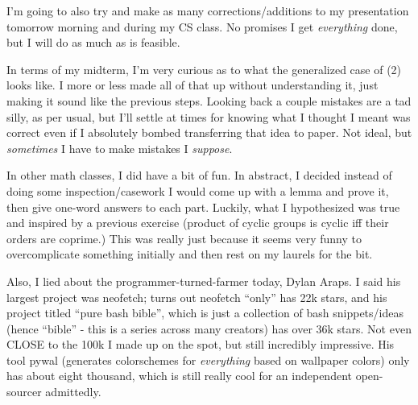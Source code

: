 \documentclass[12pt]{article}
\begin{document}
I'm going to also try and make as many corrections/additions to my presentation tomorrow morning and during my CS class.
No promises I get \emph{everything} done, but I will do as much as is feasible.

In terms of my midterm, I'm very curious as to what the generalized case of (2) looks like.
I more or less made all of that up without understanding it, just making it sound like the previous steps.
Looking back a couple mistakes are a tad silly, as per usual, but I'll settle at times for knowing what I thought I meant was correct even
if I absolutely bombed transferring that idea to paper. Not ideal, but \emph{sometimes} I have to make mistakes I \emph{suppose}.

In other math classes, I did have a bit of fun.
In abstract, I decided instead of doing some inspection/casework I would come up with a lemma and prove it, then give one-word answers
to each part. Luckily, what I hypothesized was true and inspired by a previous exercise (product of cyclic groups is cyclic iff their orders are coprime.)
This was really just because it seems very funny to overcomplicate something initially and then rest on my laurels for the bit.

Also, I lied about the programmer-turned-farmer today, Dylan Araps. I said his largest project was neofetch; turns out neofetch ``only'' has 22k stars, and his
project titled ``pure bash bible'', which is just a collection of bash snippets/ideas (hence ``bible'' - this is a series across many creators)
has over 36k stars. Not even CLOSE to the 100k I made up on the spot, but still incredibly impressive.
His tool pywal (generates colorschemes for \emph{everything} based on wallpaper colors) only has about eight thousand,
which is still really cool for an independent open-sourcer admittedly.
\end{document}
